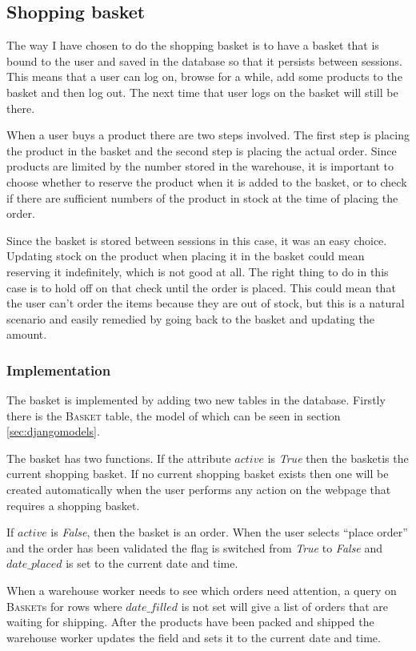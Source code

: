 \documentclass[12pt, a4paper,titlepage]{article}
\begin{document}
\subsection{Shopping basket}
The way I have chosen to do the shopping basket is to have a basket that is
bound to the user and saved in the database so that it persists between
sessions.
This means that a user can log on, browse for a while, add some products to
the basket and then log out. The next time that user logs on the basket will
still be there.

When a user buys a product there are two steps involved. The first step is
placing the product in the basket and the second step is placing the actual
order. Since products are limited by the number stored in the warehouse,
it is important to choose whether to reserve the product when it is added
to the basket, or to check if there are sufficient numbers of the product in 
stock at the time of placing the order.

Since the basket is stored between sessions in this case, it was an easy choice.
Updating stock on the product when placing it in the basket could mean
reserving it indefinitely, which is not good at all.
The right thing to do in this case is to hold off on that check until the order
is placed. This could mean that the user can't order the items because they
are out of stock, but this is a natural scenario and easily remedied by going
back to the basket and updating the amount.

\subsubsection{Implementation}
The basket is implemented by adding two new tables in the database.
Firstly there is the \textsc{Basket} table, the model of which can be seen in section \ref{sec:djangomodels}.

The basket has two functions. If the attribute $active$ is \emph{True} then 
the basketis the current shopping basket. 
If no current shopping basket exists then one will be created automatically
when the user performs any action on the webpage that requires a shopping basket.

If $active$ is \emph{False}, then the basket is an order. When the user selects 
``place order'' and the order has been validated the flag is switched from
\emph{True} to \emph{False} and $date\_placed$ is set to the current date and time.

When a warehouse worker needs to see which orders need attention, a query 
on \textsc{Basket}s for rows where $date\_filled$ is not set will give a list
of orders that are waiting for shipping. After the products have been packed
and shipped the warehouse worker updates the field and sets it to the current
date and time.
\end{document}
